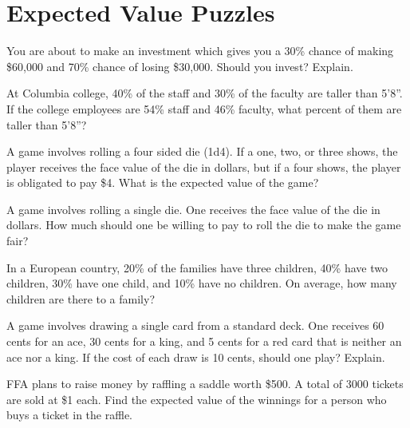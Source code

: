 \section{Expected Value Puzzles}

\begin{puzzle}
    You are about to make an investment which gives you a 30\% chance of making \$60,000 and 70\% chance of losing \$30,000. Should you invest? Explain.
\end{puzzle}

\begin{puzzle}
    At Columbia college, 40\% of the staff and 30\% of the faculty are taller than 5'8''. If the college employees are 54\% staff and 46\% faculty, what percent of them are taller than 5'8''?
\end{puzzle}

\begin{puzzle}
    A game involves rolling a four sided die (1d4). If a one, two, or three shows, the player receives the face value of the die in dollars, but if a four shows, the player is obligated to pay \$4. What is the expected value of the game?
\end{puzzle}

\begin{puzzle}
    A game involves rolling a single die. One receives the face value of the die in dollars. How much should one be willing to pay to roll the die to make the game fair?
\end{puzzle}

\begin{puzzle}
    In a European country, 20\% of the families have three children, 40\% have two children, 30\% have one child, and 10\% have no children. On average, how many children are there to a family?
\end{puzzle}

\begin{puzzle}
    A game involves drawing a single card from a standard deck. One receives 60 cents for an ace, 30 cents for a king, and 5 cents for a red card that is neither an ace nor a king. If the cost of each draw is 10 cents, should one play? Explain.
\end{puzzle}

\begin{puzzle}
    FFA plans to raise money by raffling a saddle worth \$500. A total of 3000 tickets are sold at \$1 each. Find the expected value of the winnings for a person who buys a ticket in the raffle.
\end{puzzle}

